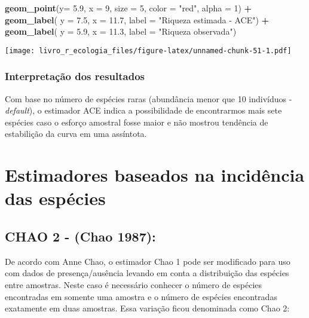 \documentclass[
]{book}
\newenvironment{Shaded}{\begin{snugshade}}{\end{snugshade}}
\newcommand{\DataTypeTok}[1]{\textcolor[rgb]{0.13,0.29,0.53}{#1}}
\newcommand{\DecValTok}[1]{\textcolor[rgb]{0.00,0.00,0.81}{#1}}
\newcommand{\FloatTok}[1]{\textcolor[rgb]{0.00,0.00,0.81}{#1}}
\newcommand{\KeywordTok}[1]{\textcolor[rgb]{0.13,0.29,0.53}{\textbf{#1}}}
\newcommand{\NormalTok}[1]{#1}
\newcommand{\OperatorTok}[1]{\textcolor[rgb]{0.81,0.36,0.00}{\textbf{#1}}}
\newcommand{\StringTok}[1]{\textcolor[rgb]{0.31,0.60,0.02}{#1}}
\begin{document}
\begin{Shaded}
\begin{Highlighting}[]
\StringTok{  }\KeywordTok{geom_point}\NormalTok{(}\DataTypeTok{y=} \FloatTok{5.9}\NormalTok{, }\DataTypeTok{x =} \DecValTok{9}\NormalTok{, }\DataTypeTok{size =} \DecValTok{5}\NormalTok{, }\DataTypeTok{color =} \StringTok{"red"}\NormalTok{, }\DataTypeTok{alpha =} \DecValTok{1}\NormalTok{) }\OperatorTok{+}\StringTok{ }
\StringTok{  }\KeywordTok{geom_label}\NormalTok{( }\DataTypeTok{y =} \FloatTok{7.5}\NormalTok{, }\DataTypeTok{x =} \FloatTok{11.7}\NormalTok{, }\DataTypeTok{label =} \StringTok{"Riqueza estimada - ACE"}\NormalTok{) }\OperatorTok{+}
\StringTok{  }\KeywordTok{geom_label}\NormalTok{( }\DataTypeTok{y =} \FloatTok{5.9}\NormalTok{, }\DataTypeTok{x =} \FloatTok{11.3}\NormalTok{, }\DataTypeTok{label =} \StringTok{"Riqueza observada"}\NormalTok{)}
\end{Highlighting}
\end{Shaded}

\texttt{[image: livro\_r\_ecologia\_files/figure-latex/unnamed-chunk-51-1.pdf]}

\hypertarget{interpretauxe7uxe3o-dos-resultados-1}{%
\subsubsection{Interpretação dos resultados}\label{interpretauxe7uxe3o-dos-resultados-1}}

Com base no número de espécies raras (abundância menor que 10 indivíduos - \emph{default}), o estimador ACE indica a possibilidade de encontrarmos mais sete espécies caso o esforço amostral fosse maior e não mostrou tendência de estabilição da curva em uma assíntota.

\hypertarget{estimadores-baseados-na-inciduxeancia-das-espuxe9cies}{%
\section{Estimadores baseados na incidência das espécies}\label{estimadores-baseados-na-inciduxeancia-das-espuxe9cies}}

\hypertarget{chao-2---chao-1987}{%
\subsection{CHAO 2 - (Chao 1987):}\label{chao-2---chao-1987}}

De acordo com Anne Chao, o estimador Chao 1 pode ser modificado para uso com dados de presença/ausência levando em conta a distribuição das espécies entre amostras. Neste caso é
necessário conhecer o número de espécies encontradas em somente uma amostra e o
número de espécies encontradas exatamente em duas amostras. Essa variação ficou denominada como
Chao 2:
\end{document}
